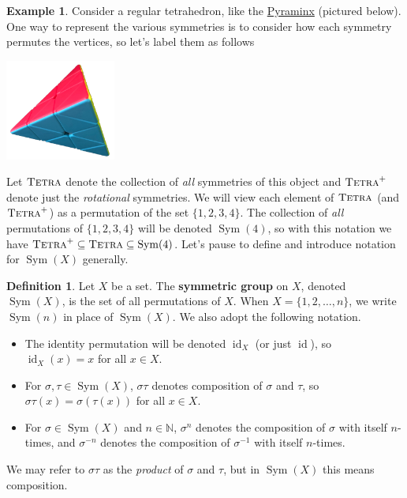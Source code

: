 \documentclass[11pt]{amsart}
\theoremstyle{plain}
\theoremstyle{definition}
\newtheorem*{definition*}{Definition}
\newtheorem{example}{Example}
\theoremstyle{remark}
\newcommand{\naturals}{\mathbb{N}}
\DeclareMathOperator{\Sym}{Sym}
\newcommand{\symtetra}{\textsc{Tetra}}
\newcommand{\rsymtetra}{\textsc{Tetra}^+}
\DeclareMathOperator{\id}{id}
\begin{document}
\begin{example}\label{exam:Tetra}
Consider a regular tetrahedron, like the \href{https://en.wikipedia.org/wiki/Pyraminx}{Pyraminx} (pictured below). One way to represent the various symmetries is to consider how each symmetry permutes the vertices, so let's label them as follows

\begin{center}
\includegraphics[height=1.3in,angle =20,origin=c]{tetra.png}\hspace{0.75in}
\end{center}


Let $\symtetra$ denote the collection of \emph{all} symmetries of this object and $\rsymtetra$ denote just the \emph{rotational} symmetries. We will view each element of $\symtetra$ (and $\rsymtetra$) as a permutation of the set $\{1,2,3,4\}$. The collection of \emph{all} permutations of $\{1,2,3,4\}$ will be denoted $\Sym(4)$, so with this notation we have $\rsymtetra\subseteq \symtetra\subseteq \Sym(4)$. Let's pause to define and introduce notation for $\Sym(X)$ generally.

\begin{definition*}
Let $X$ be a set. The \textbf{symmetric group} on $X$, denoted $\Sym(X)$, is the set of all permutations of $X$. When $X = \{1,2,\ldots, n\}$, we  write $\Sym(n)$ in place of $\Sym(X)$. We also adopt the following notation.
\begin{itemize}
\item The identity permutation will be denoted $\id_X$ (or just $\id$), so $\id_X(x)=x$ for all $x\in X$.
\item For $\sigma,\tau\in \Sym(X)$,  $\sigma\tau$ denotes composition of $\sigma$ and $\tau$, so $\sigma\tau(x) = \sigma(\tau(x))$ for all $x\in X$. 
\item For $\sigma\in \Sym(X)$ and $n\in \naturals$, $\sigma^n$ denotes the composition of $\sigma$ with itself $n$-times, and $\sigma^{-n}$ denotes the composition of $\sigma^{-1}$ with itself $n$-times.
\end{itemize}
We may refer to $\sigma\tau$ as the \emph{product} of $\sigma$ and $\tau$, but in $\Sym(X)$ this means composition.
\end{definition*}


\end{example}
\end{document}

